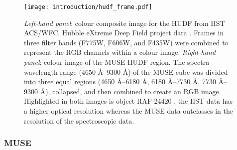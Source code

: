 \documentclass[12pt, twocolumn]{revtex4-1}    %
\begin{document}

\begin{figure}
\texttt{[image: introduction/hudf\_frame.pdf]}
\caption[Hubble Ultra Deep Field]{\textit{Left-hand panel}: colour composite image for the HUDF from HST ACS/WFC, Hubble eXtreme Deep Field project data \citep{2013ApJS..209....6I}. Frames in three filter bands (F775W, F606W, and F435W) were combined to represent the RGB channels within a colour image. \textit{Right-hand panel}: colour image of the MUSE HUDF region. The spectra wavelength range (4650 \AA--9300 \AA) of the MUSE cube was divided into three equal regions (4650 \AA--6180 \AA, 6180 \AA--7730 \AA, 7730 \AA -- 9300 \AA), collapsed, and then combined to create an RGB image. Highlighted in both images is object RAF-24420 \citep{2015AJ....150...31R}, the HST data has a higher optical resolution whereas the MUSE data outclasses in the resolution of the spectroscopic data.}
\label{fig:hst_muse_hdf}
\end{figure}


\vspace{2ex} %
\subsubsection{MUSE}
\noindent

\end{document}
